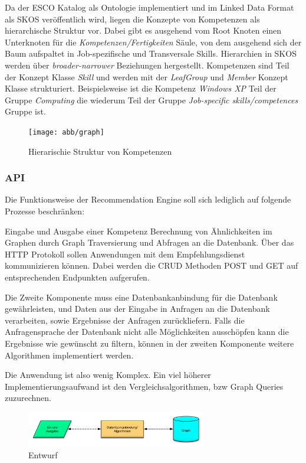 Da der ESCO Katalog als Ontologie implementiert und im Linked Data Format als SKOS veröffentlich wird, liegen die Konzepte von Kompetenzen als hierarchische Struktur vor. Dabei gibt es ausgehend vom Root Knoten einen Unterknoten für die \textit{Kompetenzen/Fertigkeiten} Säule, von dem ausgehend sich der Baum aufspaltet in Job-spezifische und Transversale Skills. Hierarchien in SKOS werden über \textit{broader-narrower} Beziehungen hergestellt. Kompetenzen sind Teil der Konzept Klasse \textit{Skill} und werden mit der \textit{LeafGroup} und \textit{Member} Konzept Klasse strukturiert. Beispielsweise ist die Kompetenz \textit{Windows XP} Teil der Gruppe \textit{Computing} die wiederum Teil der Gruppe \textit{Job-specific skills/competences} Gruppe ist.

\begin{figure}[htb]
 \centering
 \texttt{[image: abb/graph]}
 \caption[Beschreibung]{Hierarischie Struktur von Kompetenzen}
\label{fig:Beschreibung}
\end{figure}

\subsubsection{API}

 Die Funktionsweise der Recommendation Engine soll sich lediglich auf folgende Prozesse beschränken:\newline
 
 Eingabe und Ausgabe einer Kompetenz
Berechnung von Ähnlichkeiten im Graphen durch Graph Traversierung und Abfragen an die Datenbank. Über das HTTP Protokoll sollen Anwendungen mit dem Empfehlungsdienst kommunizieren können. Dabei werden die CRUD Methoden POST und GET auf entsprechenden Endpunkten aufgerufen. 
\newline

Die Zweite Komponente muss eine Datenbankanbindung für die Datenbank gewährleisten, und Daten aus der Eingabe in Anfragen an die Datenbank verarbeiten, sowie Ergebnisse der Anfragen zurückliefern. Falls die Anfragensprache der Datenbank nicht alle Möglichkeiten ausschöpfen kann die Ergebnisse wie gewünscht zu filtern, können in der zweiten Komponente weitere Algorithmen implementiert werden.\newline

Die Anwendung ist also wenig Komplex. Ein viel höherer Implementierungsaufwand ist den Vergleichsalgorithmen, bzw Graph Queries zuzurechnen. 

\begin{figure}[htb]
 \centering
 \includegraphics[width=0.7\textwidth,angle=0]{abb/entwurf}
 \caption[Beschreibung]{Entwurf}
\label{fig:Entwurf}
\end{figure}



